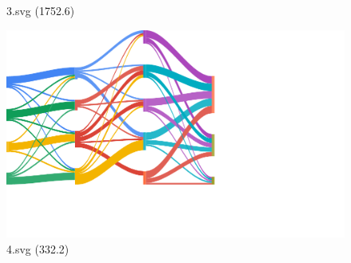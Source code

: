 \documentclass[journal]{IEEEtran}
\begin{document}
\begin{figure}[!htbp]
\begin{minipage}{0.233\columnwidth}
{3.svg (1752.6)}
\end{minipage}
\hfill
\begin{minipage}{0.233\columnwidth}
\centering
\includegraphics[width=\textwidth]{Test_set/4.pdf}
{4.svg (332.2)}
\end{minipage}
\end{figure}
\end{document}
